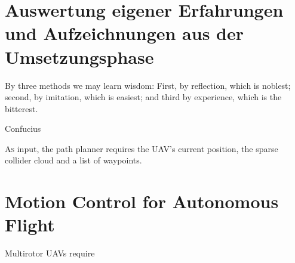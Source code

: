 
\chapter{Auswertung eigener Erfahrungen und Aufzeichnungen aus der Umsetzungsphase}
\label{chapter:auswertung_eigener_erfahrungen_und_aufzeichnungen_aus_der_umsetzungsphase}
\setlength{\epigraphwidth}{7.0cm}
\epigraph{By three methods we may learn wisdom: First, by reflection, which is noblest; second, by imitation, which is easiest; and third by experience, which is the bitterest.}{Confucius}

\ifpdf
    \graphicspath{{6_auswertung_eigener_erfahrungen_und_aufzeichnungen_aus_der_umsetzungsphase/figures/PNG/}{6_auswertung_eigener_erfahrungen_und_aufzeichnungen_aus_der_umsetzungsphase/figures/PDF/}{6_auswertung_eigener_erfahrungen_und_aufzeichnungen_aus_der_umsetzungsphase/figures/}}
\else
    \graphicspath{{6_auswertung_eigener_erfahrungen_und_aufzeichnungen_aus_der_umsetzungsphase/figures/EPS/}{6_auswertung_eigener_erfahrungen_und_aufzeichnungen_aus_der_umsetzungsphase/figures/}}
\fi

\lettrine{A}{s} input, the path planner requires the UAV's current position, the sparse collider cloud and a list of waypoints.



\chapter{Motion Control for Autonomous Flight}
\label{section_motion_control_for_autonomous_flight}

Multirotor UAVs require 

\newpage\thispagestyle{empty}
